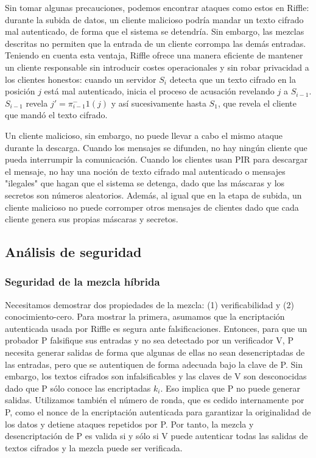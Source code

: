 Sin tomar algunas precauciones, podemos encontrar ataques como estos en Riffle: durante la subida de datos, un cliente malicioso podría mandar un texto cifrado mal autenticado, de forma que el sistema se detendría. Sin embargo, las mezclas descritas no permiten que la entrada de un cliente corrompa las demás entradas. Teniendo en cuenta esta ventaja, Riffle ofrece una manera eficiente de mantener un cliente responsable sin introducir costes operacionales y sin robar privacidad a los clientes honestos: cuando un servidor $S_i$ detecta que un texto cifrado en la posición $j$ está mal autenticado, inicia el proceso de acusación revelando $j$ a $S_{i-1}$. $S_{i-1}$ revela $j'=\pi_{i-1} ^-1(j)$ y así sucesivamente hasta $S_1$, que revela el cliente que mandó el texto cifrado.

Un cliente malicioso, sin embargo, no puede llevar a cabo el mismo ataque durante la descarga. Cuando los mensajes se difunden, no hay ningún cliente que pueda interrumpir la comunicación. Cuando los clientes usan PIR para descargar el mensaje, no hay una noción de texto cifrado mal autenticado o mensajes "ilegales" que hagan que el sistema se detenga, dado que las máscaras y los secretos son números aleatorios. Además, al igual que en la etapa de subida, un cliente malicioso no puede corromper otros mensajes de clientes dado que cada cliente genera sus propias máscaras y secretos. 

\subsection{Análisis de seguridad}

\subsubsection{Seguridad de la mezcla híbrida}

Necesitamos demostrar dos propiedades de la mezcla: (1) verificabilidad y (2) conocimiento-cero. Para mostrar la primera, asumamos que la encriptación autenticada usada por Riffle es segura ante falsificaciones. Entonces, para que un probador P falsifique sus entradas y no sea detectado por un verificador V, P necesita generar salidas de forma que algunas de ellas no sean desencriptadas de las entradas, pero que se autentiquen de forma adecuada bajo la clave de P. Sin embargo, los textos cifrados son infalsificables y las claves de V son desconocidas dado que P sólo conoce las encriptadas $k_i$. Eso implica que P no puede generar salidas. Utilizamos también el número de ronda, que es cedido internamente por P, como el nonce de la encriptación autenticada para garantizar la originalidad de los datos y detiene ataques repetidos por P. Por tanto, la mezcla y desencriptación de P es valida si y sólo si V puede autenticar todas las salidas de textos cifrados y la mezcla puede ser verificada. 

